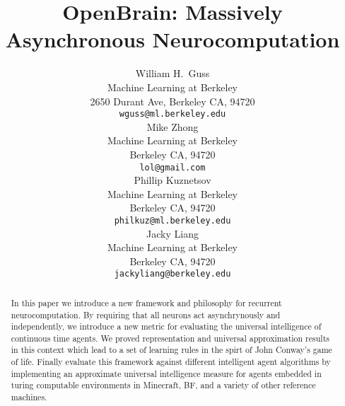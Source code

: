 \documentclass{article} %
\title{OpenBrain: Massively Asynchronous Neurocomputation}
\author{
William H.~Guss \\
Machine Learning at Berkeley\\
2650 Durant Ave, Berkeley CA, 94720 \\
\texttt{wguss@ml.berkeley.edu} \\
\And
Mike Zhong \\
Machine Learning at Berkeley \\
Berkeley CA, 94720 \\
\texttt{lol@gmail.com} \\
\And
Phillip Kuznetsov \\
Machine Learning at Berkeley \\
Berkeley CA, 94720 \\
\texttt{philkuz@ml.berkeley.edu} \\
\And
Jacky Liang \\
Machine Learning at Berkeley \\
Berkeley CA, 94720 \\
\texttt{jackyliang@berkeley.edu} \\
}
\numberwithin{equation}{subsection}
\numberwithin{theorem}{subsection}
\begin{document}
\maketitle

\begin{abstract}
	In this paper we introduce a new framework and philosophy for recurrent neurocomputation. By requiring that all neurons act asynchrynously and independently, we introduce a new metric for evaluating the universal intelligence of continuous time agents. We proved representation and universal approximation results in this context which lead to a set of learning rules in the spirt of John Conway's game of life. Finally evaluate this framework against different intelligent agent algorithms by implementing an approximate universal intelligence measure for agents embedded in turing computable environments in Minecraft, BF, and a variety of other reference machines. 
\end{abstract}








\printbibliography


\end{document}
